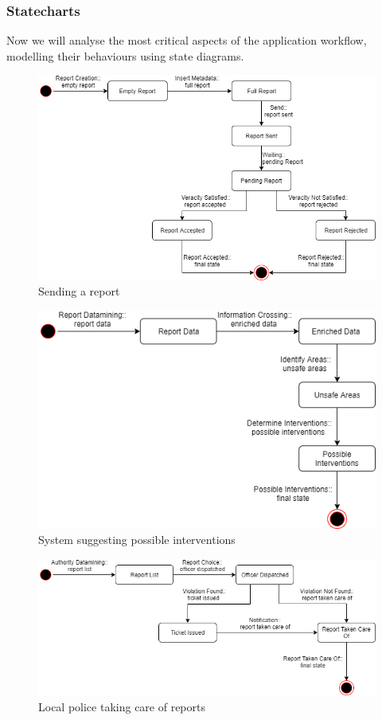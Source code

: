 \subsubsection{Statecharts}
Now we will analyse the most critical aspects of the application workflow, modelling their behaviours using state diagrams.
\begin{figure}[H]
	\centering
	\includegraphics[width=\textwidth]{Images/ReportChart.png}
	\caption{\label{fig:metamodel2}Sending a report}
\end{figure}
\begin{figure}[H]
	\centering
	\includegraphics[scale=0.7]{Images/InterventionChart.png}
	\caption{\label{fig:metamodel2}System suggesting possible interventions}
\end{figure}
\begin{figure}[H]
	\centering
	\includegraphics[width=\textwidth]{Images/PoliceChart.png}
	\caption{\label{fig:metamodel2}Local police taking care of reports}
\end{figure}


